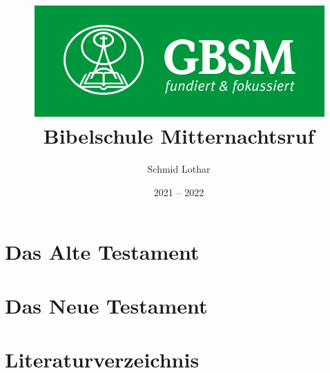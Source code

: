 \documentclass{inc/bible_class}
\author{Schmid Lothar}
\date{2021 -- 2022}
\title{
    \includegraphics[scale=1]{Daten/images/GBSM.png}\\
    \textbf{Bibelschule Mitternachtsruf}
}
\begin{document}
\maketitle
\tableofcontents

\newpage


\chapter{Das Alte Testament}

\chapter{Das Neue Testament}

\chapter{Literaturverzeichnis}

\end{document}
